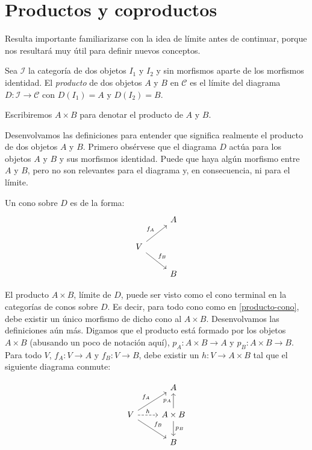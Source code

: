 \documentclass[12pt, twoside]{book}
\newcommand{\newterm}[1]{\index{#1}\emph{#1}}
\newcommand{\cat}{{\mathcal{C}}}
\begin{document}
\section{Productos y coproductos}

Resulta importante familiarizarse con la idea de límite antes de continuar, porque nos resultará muy útil para definir nuevos conceptos.

\begin{definition}
Sea $\mathcal{I}$ la categoría de dos objetos $I_1$ y $I_2$ y sin morfismos aparte de los morfismos identidad. El \newterm{producto} de dos objetos $A$ y $B$ en $\cat$ es el límite del diagrama $D \colon \mathcal{I} \to \cat$ con $D(I_1) = A$ y $D(I_2) = B$.

Escribiremos $A \times B$ para denotar el producto de $A$ y $B$.
\end{definition}

Desenvolvamos las definiciones para entender que significa realmente el producto de dos objetos $A$ y $B$.
Primero obsérvese que el diagrama $D$ actúa para  los objetos $A$ y $B$ y sus morfismos identidad.
Puede que haya algún morfismo entre $A$ y $B$, pero no son relevantes para el diagrama y, en consecuencia, ni para el límite.

Un cono sobre $D$ es de la forma:
\begin{equation}\label{producto-cono} \begin{tikzcd}
 & A\\
V \arrow[ur,"f_A"] \arrow[dr,"f_B"]\\
 & B
\end{tikzcd} \end{equation}

El producto $A \times B$, límite de $D$, puede ser visto como el cono terminal en la categorías de conos sobre $D$.
Es decir, para todo cono como en \ref{producto-cono}, debe existir un único morfismo de dicho cono al $A \times B$.
Desenvolvamos las definiciones aún más.
Digamos que el producto está formado por los objetos $A \times B$ (abusando un poco de notación aquí), $p_A \colon A \times B \to A$ y $p_B \colon A \times B \to B$.
Para todo $V$, $f_A \colon V \to A$ y $f_B \colon V \to B$, debe existir un $h \colon V \to A \times B$ tal que el siguiente diagrama conmute:

\[\begin{tikzcd}
 & A\\
V \arrow[ur,"f_A"] \arrow[dr,"f_B"] \arrow[r,dashed,"h"] & A \times B \arrow[u,"p_A"] \arrow[d,"p_B"]\\
 & B
\end{tikzcd}\]
\end{document}
